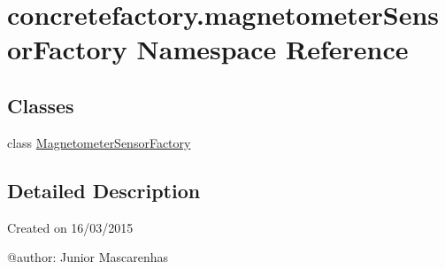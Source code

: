 \hypertarget{namespaceconcretefactory_1_1magnetometerSensorFactory}{}\section{concretefactory.\+magnetometer\+Sensor\+Factory Namespace Reference}
\label{namespaceconcretefactory_1_1magnetometerSensorFactory}
\subsection*{Classes}
\begin{DoxyCompactItemize}
\item 
class \hyperlink{classconcretefactory_1_1magnetometerSensorFactory_1_1MagnetometerSensorFactory}{Magnetometer\+Sensor\+Factory}
\end{DoxyCompactItemize}


\subsection{Detailed Description}
\begin{DoxyVerb}Created on 16/03/2015

@author: Junior Mascarenhas
\end{DoxyVerb}
 